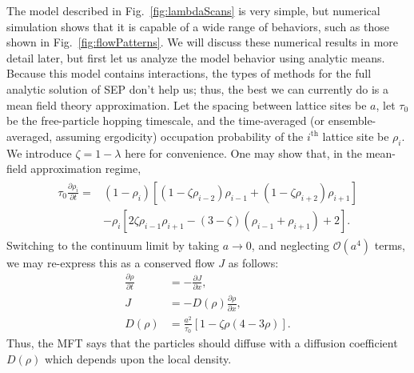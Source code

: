 \documentclass[
reprint,
 amsmath,amssymb,
 aps,
 prl,
]{revtex4-1}
\newcommand{\partDeriv}[2]{\frac{\partial #1}{\partial #2}}
\begin{document}


The model described in Fig.~\ref{fig:lambdaScans} is very simple, but numerical simulation shows that it is capable of a wide range of behaviors, such as those shown in Fig.~\ref{fig:flowPatterns}. We will discuss
these numerical results in more detail later, but first let us analyze the model behavior using analytic means.
Because this model contains interactions, the types of methods for the full analytic solution of SEP don't help us; thus, the best we can currently do is a mean field theory approximation.
Let the spacing between lattice sites be $a$, let $\tau_0$ be the free-particle hopping timescale, and the time-averaged (or ensemble-averaged, assuming ergodicity) occupation probability of the $i^{\mathrm{th}}$ lattice site be $\rho_i$.
We introduce $\zeta = 1 - \lambda $ here for convenience.
One may show that, in the mean-field approximation regime,
\begin{align}
\begin{split}
 \tau_0 \partDeriv{\rho_i}{t} = &\left( 1-\rho_i \right) \left[ \left(1-\zeta\rho_{i-2} \right) \rho_{i-1} + \left(1-\zeta\rho_{i+2} \right) \rho_{i+1} \right] \\
 &- \rho_i \left[ 2 \zeta \rho_{i-1} \rho_{i+1}  - (3-\zeta)\left(\rho_{i-1} + \rho_{i+1}\right) + 2 \right].
 \end{split}
 \end{align}
Switching to the continuum limit by taking $a\rightarrow 0$, and neglecting $\mathcal{O}(a^4)$ terms, we may re-express this as a conserved flow $J$ as follows:
\begin{align}
 \partDeriv{\rho}{t} &= - \partDeriv{J}{x}, \\
 J &= -  D(\rho) \partDeriv{\rho}{x}, \\
 D(\rho) &= \frac{a^2}{\tau_0} \left[1 - \zeta \rho\left(4-3\rho\right) \right]. \label{eq:diffCoeff} 
\end{align}
Thus, the MFT says that the particles should diffuse with a diffusion coefficient $D(\rho)$ which depends upon the local density.
\end{document}
